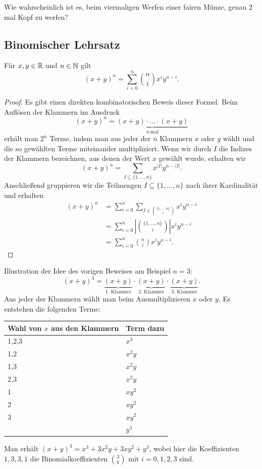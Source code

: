 \begin{aufg}
	Wie wahrscheinlich ist es, beim viermaligen Werfen einer fairen Münze, genau $2$ mal Kopf zu werfen?
\end{aufg} 

\subsection{Binomischer Lehrsatz}

\begin{thm} 
	Für $x, y \in \mathbb{R}$ und $n \in \mathbb{N}$ gilt 
	\[
			(x+y)^n = \sum_{i=0}^n \binom{n}{i} x^i y^{n-i}. 
	\]
\end{thm} 
\begin{proof}
	Es gibt einen direkten kombinatorischen Beweis dieser Formel. Beim Auflösen der Klammern im Ausdruck 
	\[
			(x+y)^n = \underbrace{(x+y) \cdot \ldots \cdot (x+y)}_{n \ \text{mal}}
	\]
	erhält man $2^n$ Terme, indem man aus jeder der $n$ Klammern $x$ oder $y$ wählt und die so gewählten Terme miteinander multipliziert. Wenn wir durch $I$ die Indizes der Klammern bezeichnen, aus denen der Wert $x$ gewählt wurde, erhalten wir 
	\[
			(x+y)^n = \sum_{I \subseteq \{1,\ldots,n\}} x^{|I|} y^{n - |I|}. 
	\]
	Anschließend gruppieren wir die Teilmengen $I \subseteq \{1,\ldots,n\}$ nach ihrer Kardinalität und erhalten
	\begin{align*}
			(x+y)^n & =\sum_{i=0}^n \sum_{I \in \binom{\{1,\ldots,n\}}{i}} x^i y^{n-i} 
			\\ & = \sum_{i=0}^n \left| \binom{\{1,\ldots,n\}}{i} \right| x^i y^{n-i} 
			\\ & = \sum_{i=0}^n \binom{n}{i}  x^i y^{n-i}.
	\end{align*} 
\end{proof} 

\begin{bsp}
	Illustration der Idee des vorigen Beweises am Beispiel $n=3$: 
	\[
	(x+y)^3 = \underbrace{ (x+y) }_{\text{1. Klammer}} \cdot \underbrace{ (x+y) }_{\text{2. Klammer}} \cdot \underbrace{ (x+y) }_{\text{3. Klammer}}.
	\]
	Aus jeder der Klammern wählt man beim Ausmultiplizieren $x$ oder $y$. Es entstehen die folgenden Terme: 
	\begin{center} 
		\begin{tabular}{ll}
			Wahl von $x$ aus den Klammern & Term dazu 
			\\ \hline \hline 
			1,2,3 & $x^3$
			\\ \hline 1,2 &  $x^2 y$
			\\ 1,3 &  $x^2 y$
			\\ 2,3 &  $x^2 y$
			\\ \hline 1 & $x y^2$
			\\ 2 &  $x y^2$
			\\ 3 & $ x y^2$
			\\ \hline & $y^3$
		\end{tabular} 
	\end{center} 
	Man erhält $(x+y)^3 = x^3+ 3 x^2 y + 3 x y^2 + y^3$, wobei hier die Koeffizienten $1,3,3,1$ die Binomialkoeffizienten $\binom{3}{k}$ mit $i=0,1,2,3$ sind. 
\end{bsp} 

